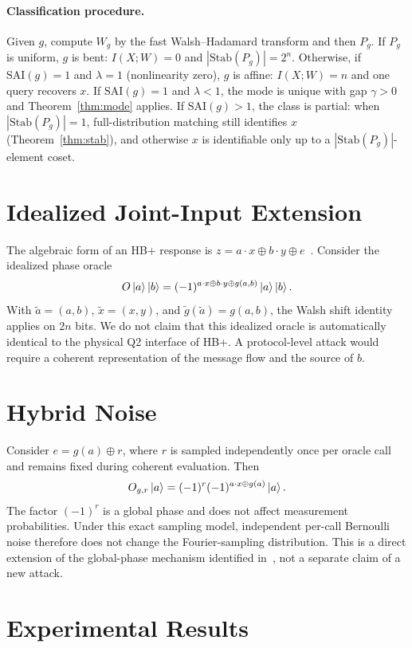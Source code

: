 \documentclass[10pt,twocolumn]{article}
\theoremstyle{definition}
\begin{document}
\paragraph{Classification procedure.} Given $g$, compute $W_g$ by the fast Walsh--Hadamard transform and then $P_g$. If $P_g$ is uniform, $g$ is bent: $I(X;W) = 0$ and $|\mathrm{Stab}(P_g)| = 2^n$. Otherwise, if $\mathrm{SAI}(g) = 1$ and $\lambda = 1$ (nonlinearity zero), $g$ is affine: $I(X;W) = n$ and one query recovers $x$. If $\mathrm{SAI}(g) = 1$ and $\lambda < 1$, the mode is unique with gap $\gamma > 0$ and Theorem~\ref{thm:mode} applies. If $\mathrm{SAI}(g) > 1$, the class is partial: when $|\mathrm{Stab}(P_g)| = 1$, full-distribution matching still identifies $x$ (Theorem~\ref{thm:stab}), and otherwise $x$ is identifiable only up to a $|\mathrm{Stab}(P_g)|$-element coset.

\section{Idealized Joint-Input Extension}

The algebraic form of an HB+ response is $z = a \cdot x \oplus b \cdot y \oplus e$~\cite{cid2026}. Consider the idealized phase oracle
\[ O\ket{a}\ket{b} = (-1)^{a \cdot x \oplus b \cdot y \oplus g(a,b)}\ket{a}\ket{b}. \]
With $\tilde{a} = (a,b)$, $\tilde{x} = (x,y)$, and $\tilde{g}(\tilde{a}) = g(a,b)$, the Walsh shift identity applies on $2n$ bits. We do not claim that this idealized oracle is automatically identical to the physical Q2 interface of HB+. A protocol-level attack would require a coherent representation of the message flow and the source of $b$.

\section{Hybrid Noise}

Consider $e = g(a) \oplus r$, where $r$ is sampled independently once per oracle call and remains fixed during coherent evaluation. Then
\[ O_{g,r}\ket{a} = (-1)^r(-1)^{a \cdot x \oplus g(a)}\ket{a}. \]
The factor $(-1)^r$ is a global phase and does not affect measurement probabilities. Under this exact sampling model, independent per-call Bernoulli noise therefore does not change the Fourier-sampling distribution. This is a direct extension of the global-phase mechanism identified in~\cite{cid2026}, not a separate claim of a new attack.

\section{Experimental Results}
\end{document}
